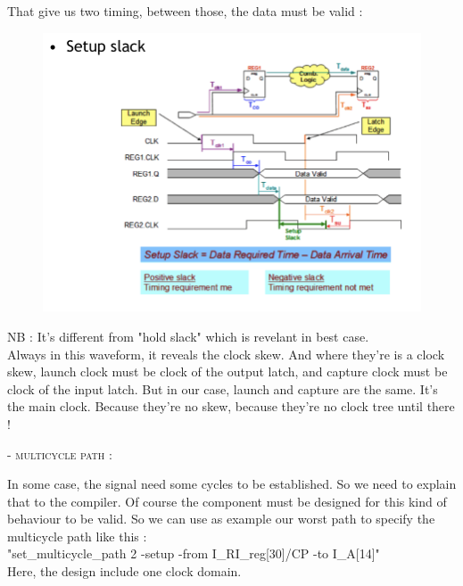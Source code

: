 \newpage
That give us two timing, between those, the data must be valid :

\begin{figure}[h!]
    \includegraphics[width=0.95\linewidth]{images/setup_slack.png}
    \label{fig:setup_slack}
\end{figure}

NB : It's different from "hold slack" which is revelant in best case.\\

Always in this waveform, it reveals the clock skew. And where they're is a clock skew, launch clock must be clock of the output latch, and capture clock must be clock of the input latch. But in our case, launch and capture are the same. It's the main clock. Because they're no skew, because they're no clock tree until there !

\textsc{- multicycle path :}

In some case, the signal need some cycles to be established. So we need to explain that to the compiler. Of course the component must be designed for this kind of behaviour to be valid.
So we can use as example our worst path to specify the multicycle path like this :\\
{\colorbox{Gray!50}{\textcolor{RubineRed}{"set\_multicycle\_path 2 -setup -from I\_RI\_reg[30]/CP -to I\_A[14]"}}}\\Here, the design include one clock domain.


